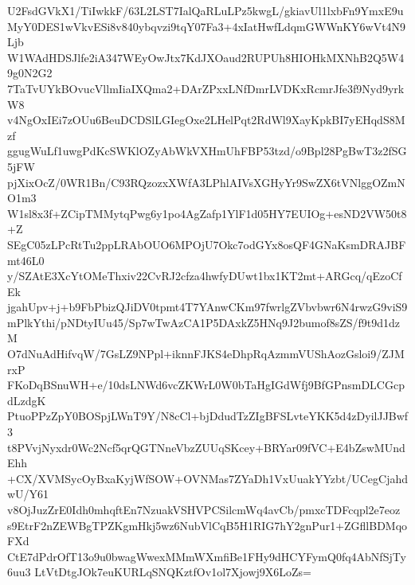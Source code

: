 U2FsdGVkX1/TiIwkkF/63L2LST7IalQaRLuLPz5kwgL/gkiavUl1lxbFn9YmxE9u
MyY0DES1wVkvESi8v840ybqvzi9tqY07Fa3+4xIatHwfLdqmGWWnKY6wVt4N9Ljb
W1WAdHDSJlfe2iA347WEyOwJtx7KdJXOaud2RUPUh8HIOHkMXNhB2Q5W49g0N2G2
7TaTvUYkBOvucVllmIiaIXQma2+DArZPxxLNfDmrLVDKxRcmrJfe3f9Nyd9yrkW8
v4NgOxIEi7zOUu6BeuDCDSlLGIegOxe2LHelPqt2RdWl9XayKpkBI7yEHqdS8Mzf
ggugWuLf1uwgPdKcSWKlOZyAbWkVXHmUhFBP53tzd/o9Bpl28PgBwT3z2fSG5jFW
pjXixOcZ/0WR1Bn/C93RQzozxXWfA3LPhlAIVsXGHyYr9SwZX6tVNlggOZmNO1m3
W1sl8x3f+ZCipTMMytqPwg6y1po4AgZafp1YlF1d05HY7EUIOg+esND2VW50t8+Z
SEgC05zLPcRtTu2ppLRAbOUO6MPOjU7Okc7odGYx8osQF4GNaKsmDRAJBFmt46L0
y/SZAtE3XcYtOMeThxiv22CvRJ2cfza4hwfyDUwt1bx1KT2mt+ARGcq/qEzoCfEk
jgahUpv+j+b9FbPbizQJiDV0tpmt4T7YAnwCKm97fwrlgZVbvbwr6N4rwzG9viS9
mPlkYthi/pNDtyIUu45/Sp7wTwAzCA1P5DAxkZ5HNq9J2bumof8sZS/f9t9d1dzM
O7dNuAdHifvqW/7GsLZ9NPpl+iknnFJKS4eDhpRqAzmmVUShAozGsloi9/ZJMrxP
FKoDqBSnuWH+e/10dsLNWd6vcZKWrL0W0bTaHgIGdWfj9BfGPnsmDLCGcpdLzdgK
PtuoPPzZpY0BOSpjLWnT9Y/N8cCl+bjDdudTzZIgBFSLvteYKK5d4zDyilJJBwf3
t8PVvjNyxdr0Wc2Ncf5qrQGTNneVbzZUUqSKcey+BRYar09fVC+E4bZswMUndEhh
+CX/XVMSycOyBxaKyjWfSOW+OVNMas7ZYaDh1VxUuakYYzbt/UCegCjahdwU/Y61
v8OjJuzZrE0Idh0mhqftEn7NzuakVSHVPCSilcmWq4avCb/pmxcTDFcqpl2e7eoz
s9EtrF2nZEWBgTPZKgmHkj5wz6NubVlCqB5H1RIG7hY2gnPur1+ZGfllBDMqoFXd
CtE7dPdrOfT13o9u0bwagWwexMMmWXmfiBe1FHy9dHCYFymQ0fq4AbNfSjTy6uu3
LtVtDtgJOk7euKURLqSNQKztfOv1ol7Xjowj9X6LoZs=
